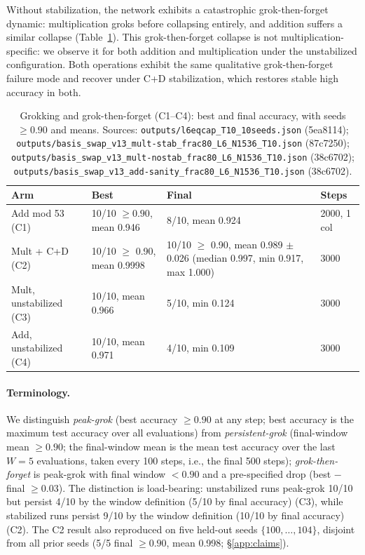 \documentclass[11pt]{article}
\begin{document}
Without stabilization, the network exhibits a catastrophic grok-then-forget dynamic: multiplication groks before collapsing entirely, and addition suffers a similar collapse (Table~\ref{tab:grok}). This grok-then-forget collapse is not multiplication-specific: we observe it for both addition and multiplication under the unstabilized configuration. Both operations exhibit the same qualitative grok-then-forget failure mode and recover under C+D stabilization, which restores stable high accuracy in both.

\begin{table}[ht]
\centering
\caption{Grokking and grok-then-forget (C1--C4): best and final accuracy, with seeds $\geq 0.90$ and means. Sources: \texttt{outputs/l6eqcap\_T10\_10seeds.json} (5ea8114); \texttt{outputs/basis\_swap\_v13\_mult-stab\_frac80\_L6\_N1536\_T10.json} (87c7250); \texttt{outputs/basis\_swap\_v13\_mult-nostab\_frac80\_L6\_N1536\_T10.json} (38c6702); \texttt{outputs/basis\_swap\_v13\_add-sanity\_frac80\_L6\_N1536\_T10.json} (38c6702).}
\label{tab:grok}
\small
\begin{tabularx}{\textwidth}{@{}lXXX@{}}
\toprule
Arm & Best & Final & Steps \\
\midrule
Add mod 53 (C1) & 10/10 $\geq 0.90$, mean 0.946 & 8/10, mean 0.924 & 2000, 1 col \\
Mult + C+D (C2) & 10/10 $\geq$ 0.90, mean 0.9998 & 10/10 $\geq$ 0.90, mean 0.989 $\pm$ 0.026 (median 0.997, min 0.917, max 1.000) & 3000 \\
Mult, unstabilized (C3) & 10/10, mean 0.966 & 5/10, min 0.124 & 3000 \\
Add, unstabilized (C4) & 10/10, mean 0.971 & 4/10, min 0.109 & 3000 \\
\bottomrule
\end{tabularx}
\end{table}

\paragraph{Terminology.} We distinguish \emph{peak-grok} (best accuracy $\geq 0.90$ at any step; best accuracy is the maximum test accuracy over all evaluations) from \emph{persistent-grok} (final-window mean $\geq 0.90$; the final-window mean is the mean test accuracy over the last $W{=}5$ evaluations, taken every 100 steps, i.e., the final 500 steps); \emph{grok-then-forget} is peak-grok with final window $< 0.90$ and a pre-specified drop (best $-$ final $\geq 0.03$). The distinction is load-bearing: unstabilized runs peak-grok 10/10 but persist 4/10 by the window definition (5/10 by final accuracy) (C3), while stabilized runs persist 9/10 by the window definition (10/10 by final accuracy) (C2). The C2 result also reproduced on five held-out seeds $\{100,\dots,104\}$, disjoint from all prior seeds (5/5 final $\geq 0.90$, mean 0.998; \S\ref{app:claims}).
\end{document}
